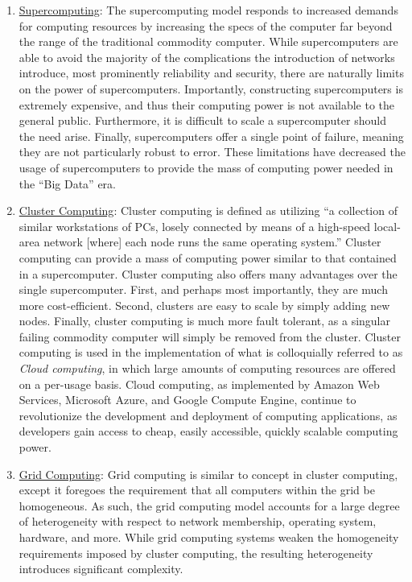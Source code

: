 \documentclass[twoside]{report}
\begin{document}
\begin{enumerate}
  \item \underline{Supercomputing}: The supercomputing model responds to
    increased demands for computing resources by increasing the specs of the
    computer far beyond the range of the traditional commodity computer.
    While supercomputers are able to avoid the majority of the complications the
    introduction of networks introduce, most prominently reliability and
    security, there are naturally limits on the power of supercomputers.
    Importantly, constructing supercomputers is extremely expensive, and thus
    their computing power is not available to the general public. Furthermore,
    it is difficult to scale a supercomputer should the need arise. Finally,
    supercomputers offer a single point of failure, meaning they are not
    particularly robust to error. These limitations have decreased the usage of
    supercomputers to provide the mass of computing power needed in the ``Big
    Data'' era.

  \item \underline{Cluster Computing}: Cluster computing is defined as utilizing
    ``a collection of similar workstations of PCs, losely connected by means of
    a high-speed local-area network [where] each node runs the same operating
    system.''\cite[pg. 17-18]{distributed-systems-principles-and-paradigms}
    Cluster computing can provide a mass of computing power similar to
    that contained in a supercomputer. Cluster computing also offers many
    advantages over the single supercomputer. First, and perhaps most
    importantly, they are much more cost-efficient. Second, clusters are easy to
    scale by simply adding new nodes. Finally, cluster computing is much more fault
    tolerant, as a singular failing commodity computer will simply be removed
    from the cluster. Cluster computing is used in the
    implementation of what is colloquially referred to as \textit{Cloud
    computing}, in which large amounts of computing resources are offered on a
    per-usage basis.\cite[pg. 13]{distributed-systems-concepts-and-design}
    Cloud computing, as implemented by Amazon Web
    Services,\cite{amazon-web-services} Microsoft Azure,\cite{microsoft-azure}
    and Google Compute Engine,\cite{google-compute-engine} continue to
    revolutionize the development and deployment of computing applications, as
    developers gain access to cheap, easily accessible, quickly scalable
    computing power.

  \item \underline{Grid Computing}: Grid computing is similar to concept in
    cluster computing, except it foregoes the requirement that all computers
    within the grid be homogeneous. As such, the grid computing model accounts
    for a large degree of heterogeneity with respect to network membership,
    operating system, hardware, and more.\cite[pg.
    18]{distributed-systems-principles-and-paradigms} While grid computing
    systems weaken the homogeneity requirements imposed by cluster computing,
    the resulting heterogeneity introduces significant complexity.

\end{enumerate}
\end{document}
